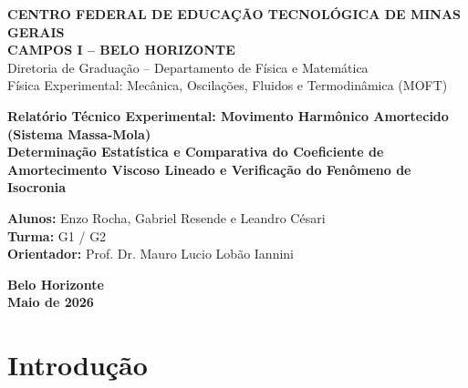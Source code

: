 \documentclass[12pt, a4paper]{article}
\begin{document}
\begin{titlepage}
    \begin{center}
        \large\textbf{CENTRO FEDERAL DE EDUCAÇÃO TECNOLÓGICA DE MINAS GERAIS}\\
        \large\textbf{CAMPOS I -- BELO HORIZONTE}\\
        \medskip
        \large{Diretoria de Graduação -- Departamento de Física e Matemática}\\
        \large{Física Experimental: Mecânica, Oscilações, Fluidos e Termodinâmica (MOFT)}\\
        
        \vspace{4.0cm}
        
        \LARGE\textbf{Relatório Técnico Experimental: Movimento Harmônico Amortecido (Sistema Massa-Mola)}\\
        \vspace{0.5cm}
        \large\textbf{Determinação Estatística e Comparativa do Coeficiente de Amortecimento Viscoso Lineado e Verificação do Fenômeno de Isocronia}\\
        
        \vspace{4.5cm}
        
        \large\textbf{Alunos:} Enzo Rocha, Gabriel Resende e Leandro Césari\\
        \large\textbf{Turma:} G1 / G2 \\
        \large\textbf{Orientador:} Prof. Dr. Mauro Lucio Lobão Iannini\\
        
        \vfill
        
        \large\textbf{Belo Horizonte}\\
        \large\textbf{Maio de 2026}
    \end{center}
\end{titlepage}

\newpage

\section{Introdução}
\end{document}
